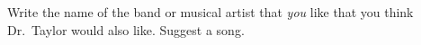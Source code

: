 \showpoints

\bonusquestion[2]
Write the name of the band or musical artist that \emph{you} like that you think Dr.~Taylor would also like. Suggest a song.

